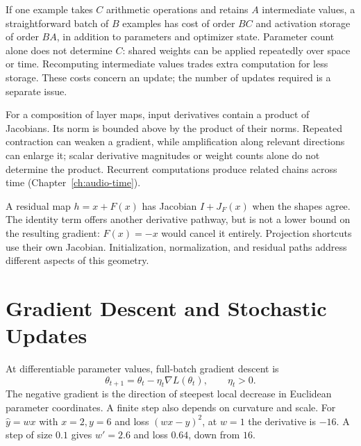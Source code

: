 If one example takes $C$ arithmetic operations and retains $A$ intermediate values, a straightforward batch of $B$ examples has cost of order $BC$ and activation storage of order $BA$, in addition to parameters and optimizer state. Parameter count alone does not determine $C$: shared weights can be applied repeatedly over space or time. Recomputing intermediate values trades extra computation for less storage. These costs concern an update; the number of updates required is a separate issue.

For a composition of layer maps, input derivatives contain a product of Jacobians. Its norm is bounded above by the product of their norms. Repeated contraction can weaken a gradient, while amplification along relevant directions can enlarge it; scalar derivative magnitudes or weight counts alone do not determine the product. Recurrent computations produce related chains across time (Chapter~\ref{ch:audio-time}).

A residual map $h=x+F(x)$ has Jacobian $I+J_F(x)$ when the shapes agree. The identity term offers another derivative pathway, but is not a lower bound on the resulting gradient: $F(x)=-x$ would cancel it entirely. Projection shortcuts use their own Jacobian. Initialization, normalization, and residual paths address different aspects of this geometry.

\section{Gradient Descent and Stochastic Updates}

At differentiable parameter values, full-batch gradient descent is
\[
\theta_{t+1}=\theta_t-\eta_t\nabla L(\theta_t),\qquad\eta_t>0.
\]
The negative gradient is the direction of steepest local decrease in Euclidean parameter coordinates. A finite step also depends on curvature and scale. For $\hat y=wx$ with $x=2,y=6$ and loss $(wx-y)^2$, at $w=1$ the derivative is $-16$. A step of size $0.1$ gives $w'=2.6$ and loss $0.64$, down from $16$.

